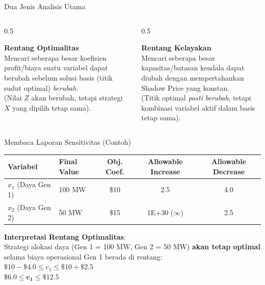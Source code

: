 \documentclass[aspectratio=169]{beamer}
\begin{document}
\begin{frame}{Dua Jenis Analisis Utama}
    \begin{columns}
        \begin{column}{0.5\textwidth}
            \begin{tcolorbox}[colback=blue!5,colframe=UNIBBlue,title=Perubahan Koefisien Tujuan ($c_j$)]
                \textbf{Rentang Optimalitas} \\
                Mencari seberapa besar koefisien profit/biaya suatu variabel dapat berubah sebelum solusi basis (titik sudut optimal) \textit{berubah}. \\
                (Nilai $Z$ akan berubah, tetapi strategi $X$ yang dipilih tetap sama).
            \end{tcolorbox}
        \end{column}
        \begin{column}{0.5\textwidth}
            \begin{tcolorbox}[colback=yellow!5,colframe=UNIBYellow,title=Perubahan Sisi Kanan ($b_i$)]
                \textbf{Rentang Kelayakan} \\
                Mencari seberapa besar kapasitas/batasan kendala dapat diubah dengan mempertahankan Shadow Price yang konstan. \\
                (Titik optimal \textit{pasti berubah}, tetapi kombinasi variabel aktif dalam basis tetap sama).
            \end{tcolorbox}
        \end{column}
    \end{columns}
\end{frame}

\begin{frame}{Membaca Laporan Sensitivitas (Contoh)}
    \begin{table}[]
    \centering
    \begin{tabular}{@{}llccc@{}}
    \toprule
    \textbf{Variabel} & \textbf{Final Value} & \textbf{Obj. Coef.} & \textbf{Allowable Increase} & \textbf{Allowable Decrease} \\ \midrule
    $x_1$ (Daya Gen 1) & 100 MW & \$10 & 2.5 & 4.0 \\
    $x_2$ (Daya Gen 2) & 50 MW & \$15 & 1E+30 ($\infty$) & 2.5 \\ \bottomrule
    \end{tabular}
    \end{table}
    \vspace{0.2cm}
    \textbf{Interpretasi Rentang Optimalitas}: \\
    Strategi alokasi daya (Gen 1 = 100 MW, Gen 2 = 50 MW) \textbf{akan tetap optimal} selama biaya operasional Gen 1 berada di rentang: \\
    $\$10 - \$4.0 \le c_1 \le \$10 + \$2.5$ \\
    $\mathbf{\$6.0 \le c_1 \le \$12.5}$
\end{frame}
\end{document}
